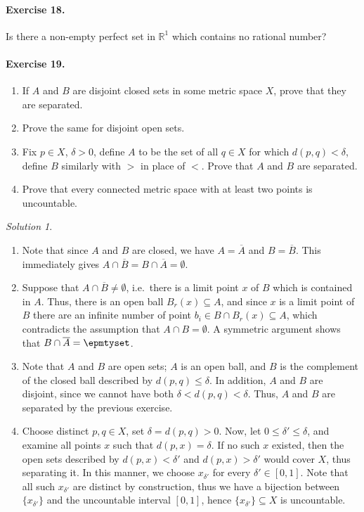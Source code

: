 \documentclass[11pt]{report}
\def\R{\mathbb{R}}
\theoremstyle{remark}
\newtheorem*{solution}{Solution}
\begin{document}
    \paragraph{Exercise 18.} Is there a non-empty perfect set in $\R^1$ which
    contains no rational number?


    \paragraph{Exercise 19.} \mbox{}
    \begin{enumerate}
        \itemsep0em
        \item If $A$ and $B$ are disjoint closed sets in some metric space $X$,
        prove that they are separated.
        \item Prove the same for disjoint open sets.
        \item Fix $p \in X$, $\delta > 0$, define $A$ to be the set of all $q \in X$
        for which $d(p, q) < \delta$, define $B$ similarly with $>$ in place of $<$.
        Prove that $A$ and $B$ are separated.
        \item Prove that every connected metric space with at least two points is
        uncountable.
    \end{enumerate}
    \begin{solution} \mbox{}
    \begin{enumerate}
        \item Note that since $A$ and $B$ are closed, we have $A = \overline{A}$ and
        $B = \overline{B}$. This immediately gives $A \cap \overline{B} = B \cap
        \overline{A} = \emptyset$.
        \item Suppose that $A \cap \overline{B} \neq \emptyset$, i.e.\ there is a
        limit point $x$ of $B$ which is contained in $A$. Thus, there is an open
        ball $B_r(x) \subseteq A$, and since $x$ is a limit point of $B$ there are
        an infinite number of point $b_i \in B \cap B_r(x) \subseteq A$, which
        contradicts the assumption that $A \cap B = \emptyset$. A symmetric argument
        shows that $B \cap \overline{A} = \epmtyset$.
        \item Note that $A$ and $B$ are open sets; $A$ is an open ball, and $B$ is
        the complement of the closed ball described by $d(p, q) \leq \delta$. In
        addition, $A$ and $B$ are disjoint, since we cannot have both $\delta < d(p,
        q) < \delta$. Thus, $A$ and $B$ are separated by the previous exercise.
        \item Choose distinct $p, q \in X$, set $\delta = d(p, q) > 0$. Now, let $0
        \leq \delta' \leq \delta$, and examine all points $x$ such that $d(p, x) =
        \delta$. If no such $x$ existed, then the open sets described by $d(p, x) <
        \delta'$ and $d(p, x) > \delta'$ would cover $X$, thus separating it. In
        this manner, we choose $x_{\delta'}$ for every $\delta' \in [0, 1]$. Note
        that all such $x_{\delta'}$ are distinct by construction, thus we have a
        bijection between $\{x_{\delta'}\}$ and the uncountable interval $[0, 1]$,
        hence $\{x_{\delta'}\} \subseteq X$ is uncountable.
    \end{enumerate}
    \end{solution}
\end{document}
